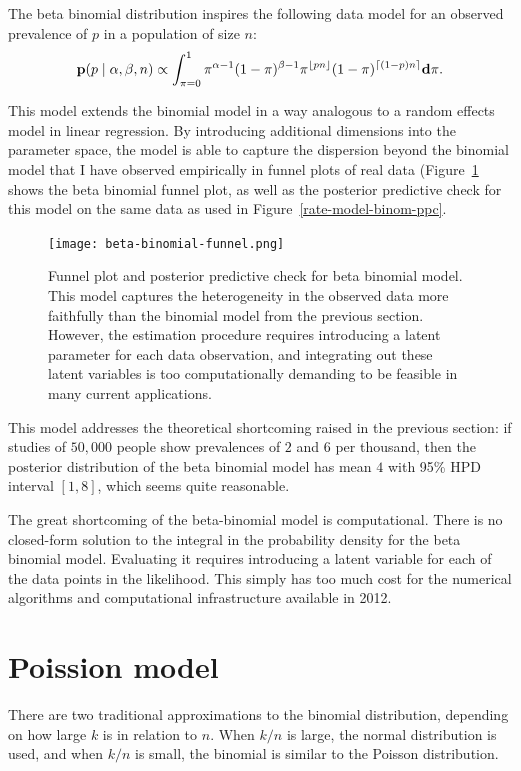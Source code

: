 The beta binomial distribution inspires the following data model for
an observed prevalence of $p$ in a population of size $n$:
\[
\mathbf{p}(p\;|\; \alpha, \beta, n) \propto 
\int_{\pi=0}^1 \pi^{\alpha-1}(1-\pi)^{\beta-1}
\pi^{\lfloor pn\rfloor} (1-\pi)^{\lceil (1-p)n\rceil} \mathbf{d}\pi.
\]

This model extends the binomial model in a way analogous to a random
effects model in linear regression.  By introducing additional
dimensions into the parameter space, the model is able to capture the
dispersion beyond the binomial model that I have observed empirically
in funnel plots of real data
(Figure~\ref{rate-model-beta-binomial-funnel} shows the beta
binomial funnel plot, as well as the posterior predictive check for
this model on the same data as used in
Figure~\ref{rate-model-binom-ppc}.

\begin{figure}[ht]
\begin{center}
\texttt{[image: beta-binomial-funnel.png]}
\end{center}
\caption{Funnel plot and posterior predictive check for beta binomial
  model. This model captures the heterogeneity in the observed data
  more faithfully than the binomial model from the previous section.
  However, the estimation procedure requires introducing a latent
  parameter for each data observation, and integrating out these
  latent variables is too computationally demanding to be feasible in
  many current applications.}
\label{rate-model-beta-binomial-funnel}
\end{figure}

This model addresses the theoretical shortcoming raised in the
previous section: if studies of $50,000$ people show prevalences of
$2$ and $6$ per thousand, then the posterior distribution of the beta
binomial model has mean $4$ with 95\% HPD interval $[1,8]$, which
seems quite reasonable.

The great shortcoming of the beta-binomial model is computational.
There is no closed-form solution to the integral in the probability
density for the beta binomial model.  Evaluating it requires
introducing a latent variable for each of the data points in the
likelihood.  This simply has too much cost for the numerical
algorithms and computational infrastructure available in 2012.

\section{Poission model}
There are two traditional approximations to the binomial distribution,
depending on how large $k$ is in relation to $n$.  When $k/n$ is
large, the normal distribution is used, and when $k/n$ is small, the
binomial is similar to the Poisson distribution.

